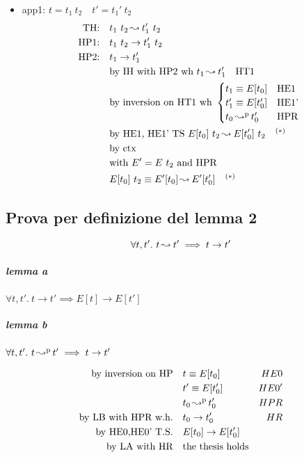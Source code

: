 \documentclass{article}
\begin{document}
\begin{itemize}
    \item app1: $t=t_1\ t_2 \quad t'=t_1'\ t_2$
        \begin{align*}
            \text{TH:}\quad  & t_1\ t_2 \cred t_1'\ t_2 \\
            \text{HP1:}\quad & t_1\ t_2 \to t_1'\ t_2 \\
            \text{HP2:}\quad & t_1 \to t_1' \\
                             & \text{by IH with HP2 wh } t_1\cred t_1' \quad \text{HT1} \\
                             & \text{by inversion on HT1 wh }
                             \begin{cases} 
                                 t_1 \equiv E[t_0]   &  \text{HE1} \\
                                 t_1'\equiv E[t_0']  & \text{HE1'} \\
                                 t_0 \credp t_0'     & \text{HPR} \\
                             \end{cases} \\
                             & \text{by HE1, HE1' TS } E[t_0]\ t_2\cred E[t_0']\ t_2 \quad^{(*)}\\
                             & \text{by ctx} \\
                             & \text{with } E'=E\ t_2\text{ and HPR} \\
                             & E[t_0]\ t_2 \equiv E'[t_0] \cred E'[t_0'] \quad^{(*)}
        \end{align*}
\end{itemize}

\subsection{Prova per definizione del lemma 2}
\[
    \forall t,t'.\ t\operatorname{ \leadsto^{} } t' \implies t\to t'
\] 
\subparagraph{lemma a} $\forall t,t'.\ t\to t' \implies E[t]\to E[t']$

\subparagraph{lemma b} $\forall t,t'.\ t\operatorname{ \leadsto^{p} } t' \implies t\to t'$

\begin{align*}
    \text {by inversion on HP} \quad& t\equiv E[t_0]  & HE0 \\
                         \quad& t'\equiv E[t_0']  & HE0' \\
                         \quad& t_0\operatorname{ \leadsto^{p} } t_0'  & HPR \\
    \text{by LB with HPR w.h.}\quad& t_0\to t_0' & HR \\
    \text{by HE0,HE0' T.S.} \quad& E[t_0] \to E[t_0']  \\
    \text{by LA with HR} \quad& \text{the thesis holds}
\end{align*}
\end{document}
